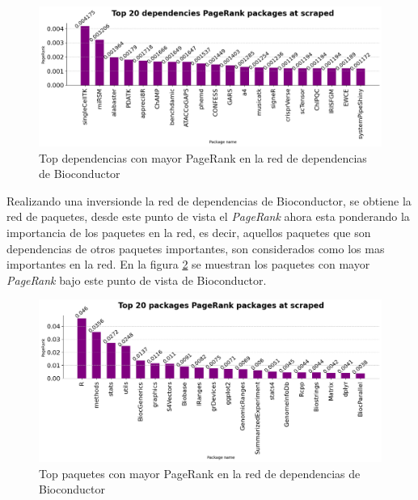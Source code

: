 \begin{figure}[h!]
    \begin{center}
        \includegraphics[width=1\textwidth]{img/bioconductor/top_pagerrank_dependencies.png}
        \caption{Top dependencias con mayor PageRank en la red de dependencias de Bioconductor}
        \label{fig:bioconductor_top_pagerank_dependencies}
    \end{center}
\end{figure}

Realizando una inversionde la red de dependencias de Bioconductor, se obtiene la red de paquetes, desde este punto de vista 
el \textit{PageRank} ahora esta ponderando la importancia de los paquetes en la red, es decir, aquellos paquetes que son dependencias
de otros paquetes importantes, son considerados como los mas importantes en la red. En la figura \ref{fig:bioconductor_top_pagerank_packages}
se muestran los paquetes con mayor \textit{PageRank} bajo este punto de vista de Bioconductor.

\begin{figure}[h!]
    \begin{center}
        \includegraphics[width=1\textwidth]{img/bioconductor/top_pagerrank_packages.png}
        \caption{Top paquetes con mayor PageRank en la red de dependencias de Bioconductor}
        \label{fig:bioconductor_top_pagerank_packages}
    \end{center}
\end{figure}








